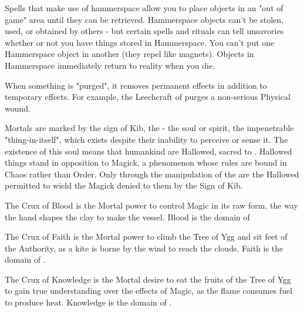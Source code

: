 {\begin{multicols}{2}
  Spells that make use of hammerspace allow you to place objects in an "out of game" area until they can be retrieved.  Hammerspace objects can't be stolen, used, or obtained by others - but certain spells and rituals can tell unsavories whether or not you have things stored in Hammerspace.  You can't put one Hammerspace object in another (they repel like magnets). Objects in Hammerspace immediately return to reality when you die.

  
  When something is "purged", it removes permanent effects in addition to temporary effects.  For example, the Leechcraft of  purges a non-serious Physical wound.  

  \newpage


  Mortals are marked by the sign of Kib, the  - the soul or spirit, the impenetrable "thing-in-itself", which exists despite their inability to perceive or sense it.  The existence of this soul means that humankind are Hallowed, sacred to \TheAuthority. Hallowed things stand in opposition to Magick, a phenomenon whose rules are bound in Chaos rather than Order.  Only through the manipulation of the  are the Hallowed permitted to wield the Magick denied to them by the Sign of Kib.



  The Crux of Blood is the Mortal power to control Magic in its raw form, the way the hand shapes the clay to make the vessel. Blood is the domain of 


  The Crux of Faith is the Mortal power to climb the Tree of Ygg and sit feet of the Authority, as a kite is borne by the wind to reach the clouds. Faith is the domain of .


  The Crux of Knowledge is the Mortal desire to eat the fruits of the Tree of Ygg to gain true understanding over the effects of Magic, as the flame consumes fuel to produce heat. Knowledge is the domain of .



\end{multicols}}
